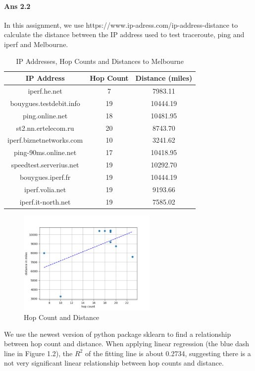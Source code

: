 \documentclass[paper=a4, fontsize=10pt]{scrartcl} %
\numberwithin{equation}{section} %
\numberwithin{figure}{section} %
\numberwithin{table}{section} %
\begin{document}
\paragraph{Ans 2.2}
In this assignment, we use https://www.ip-adress.com/ip-address-distance to calculate the distance between the IP address used to test traceroute, ping and iperf and Melbourne.
\begin{table}[htbp]
    \centering
    \caption{IP Addresses, Hop Counts and Distances to Melbourne}
    \begin{tabular}{ccc}
    \hline
    IP Address &Hop Count & Distance (miles) \\
    \hline
    iperf.he.net&7&7983.11\\
    bouygues.testdebit.info&19&10444.19\\
    ping.online.net&18&10481.95\\
    st2.nn.ertelecom.ru&20&8743.70\\
    iperf.biznetnetworks.com&10&3241.62\\
    ping-90ms.online.net&17&10418.95\\
    speedtest.serverius.net&19&10292.70\\
    bouygues.iperf.fr&19&10444.19\\
    iperf.volia.net&19&9193.66\\
    iperf.it-north.net&19&7585.02\\
    \hline
    \end{tabular}
\end{table}
\begin{figure}[htbp!]
    \centering
    \includegraphics[width=0.6\textwidth]{hop_dist_fit.png}
    \caption{Hop Count and Distance}%
    \vspace{-1em}
\end{figure}

We use the newest version of python package sklearn\cite{sklearn_api} to find a relationship between hop count and distance. When applying linear regression (the blue dash line in Figure 1.2), the $R^2$ of the fitting line is about 0.2734, suggesting there is a not very significant linear relationship between hop counts and distance. 
\end{document}
